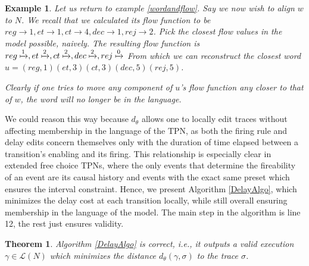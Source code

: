 \documentclass[conference]{IEEEtran}
\newtheorem{theorem}{Theorem}
\newtheorem{example}{Example}
\begin{document}
\begin{example}
	Let us return to example \ref{wordandflow}. 
	Say we now wish to align  $w$ to $N$. We recall that we calculated its flow function to be \\$reg \to 1, et \to 1, ct \to 4, dec \to 1, rej \to 2$. 
	Pick the closest flow values in the model possible, naively. 
	The resulting flow function is  $reg \xmapsto 1, et \xmapsto 2, ct \xmapsto 2, dec \xmapsto 2, rej \xmapsto 0$ From which we can reconstruct the closest word $u = (reg, 1)(et, 3)(ct, 3)(dec, 5)(rej, 5)$.
	
	Clearly if one tries to move any component of $u$'s flow function any closer to that of $w$, the word will no longer be in the language. 
	
\end{example}
We could reason this way because $d_\theta$ allows one to locally edit traces without affecting membership in the language of the TPN, as both the firing rule and delay edits concern themselves only with the duration of time elapsed between a transition's enabling and its firing. 
This relationship is especially clear in extended free choice TPNs, where the only events that determine the fireability of an event are its causal history and events with the exact same preset which ensures the interval constraint.
Hence, we present Algorithm \ref{DelayAlgo}, which minimizes the delay cost at each transition locally, while still overall ensuring membership in the language of the model. The main step in the algorithm is line 12, the rest just ensures validity. 

\begin{theorem}\label{DelayAlgoCorr} Algorithm \ref{DelayAlgo} is correct, i.e., it outputs a valid execution
	$\gamma \in \mathcal{L}(N)$ which minimizes the distance $d_\theta(\gamma, \sigma)$
	to the trace $\sigma$.
\end{theorem}
\end{document}
